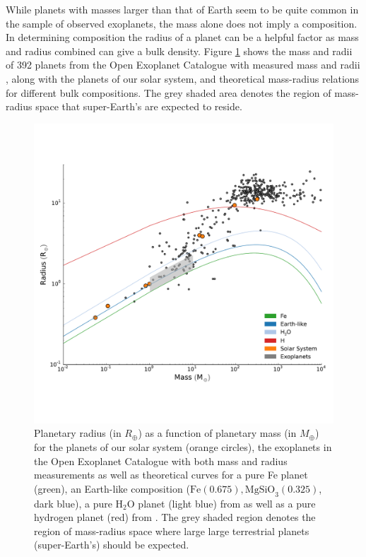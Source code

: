 While planets with masses larger than that of Earth seem to be quite common in the sample of observed exoplanets, the mass alone does not imply a composition. In determining composition the radius of a planet can be a helpful factor as mass and radius combined can give a bulk density. Figure \ref{fig:exoplanetmassradii} shows the mass and radii of 392 planets from the Open Exoplanet Catalogue with measured mass and radii \citep{rein2015}, along with the planets of our solar system, and theoretical mass-radius relations for different bulk compositions. The grey shaded area denotes the region of mass-radius space that super-Earth's are expected to reside.
\begin{figure}
	\centering
        \includegraphics[width=\textwidth]{Chapter3/Figures/ExoplanetsMassRadius.pdf}
        \caption{Planetary radius (in $R_\oplus$) as a function of planetary mass (in $M_\oplus$) for the planets of our solar system (orange circles), the exoplanets in the Open Exoplanet Catalogue with both mass and radius measurements \citep{rein2015} as well as theoretical curves for a pure Fe planet (green), an Earth-like composition ($\textrm{Fe}\left(0.675\right), \textrm{MgSiO}_3(0.325)$, dark blue), a pure $\textrm{H}_{2}\textrm{O}$ planet (light blue) from \citet{seager2007} as well as a pure hydrogen planet (red) from  \citet{zapolsky1969}. The grey shaded region denotes the region of mass-radius space where large large terrestrial planets (super-Earth's) should be expected. }
        \label{fig:exoplanetmassradii}
\end{figure}

